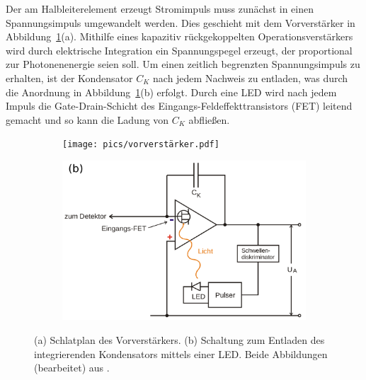 Der am Halbleiterelement erzeugt Stromimpuls muss zunächst in einen Spannungsimpuls umgewandelt werden. Dies geschieht mit 
dem Vorverstärker in Abbildung~\ref{fig: vorverstaerker}(a). Mithilfe eines kapazitiv rückgekoppelten Operationsverstärkers wird durch elektrische 
Integration ein Spannungspegel erzeugt, der proportional zur Photonenenergie seien soll. Um einen zeitlich 
begrenzten Spannungsimpuls zu erhalten, ist der Kondensator $C_K$ nach jedem Nachweis zu entladen, was durch die 
Anordnung in Abbildung~\ref{fig: vorverstaerker}(b) erfolgt. Durch eine LED wird nach jedem Impuls die Gate-Drain-Schicht des 
Eingangs-Feldeffekttransistors (FET) leitend gemacht und so kann die Ladung von $C_K$ abfließen.
\begin{figure}
\centering
\begin{subfigure}{0.49\textwidth}
\centering
\texttt{[image: pics/vorverstärker.pdf]}
\end{subfigure}
\begin{subfigure}{0.49\textwidth}
\centering
\includegraphics[width = \textwidth]{pics/led.pdf}
\end{subfigure}
\caption{(a) Schlatplan des Vorverstärkers. (b) Schaltung zum Entladen des integrierenden Kondensators mittels einer LED.
Beide Abbildungen (bearbeitet) aus \cite{anleitungv18}.}
\label{fig: vorverstaerker}
\end{figure}

